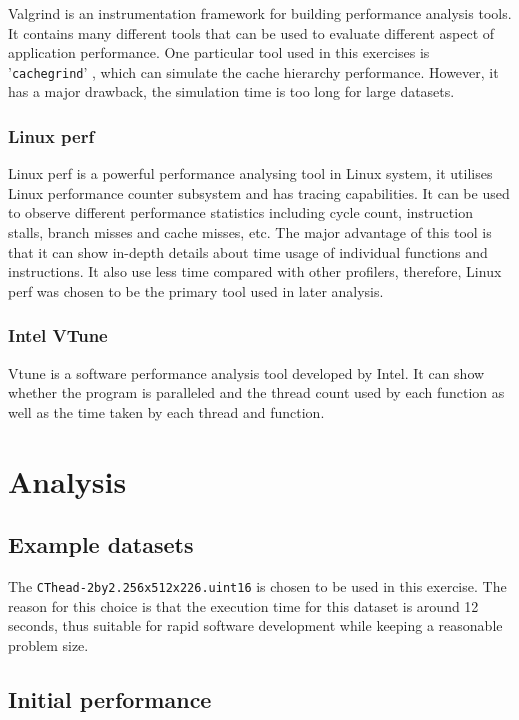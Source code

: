 \documentclass[conference]{IEEEtran}
\begin{document}
Valgrind \cite{nethercote2003valgrind} is an instrumentation framework for building performance analysis tools. It contains many different tools that can be used to evaluate different aspect of application performance. One particular tool used in this exercises is '\texttt{cachegrind}' \cite{seward2004cachegrind}, which can simulate the cache hierarchy performance. However, it has a major drawback, the simulation time is too long for large datasets.

\subsubsection{Linux perf}

Linux perf \cite{de2010new} is a powerful performance analysing tool in Linux system, it utilises Linux performance counter subsystem and has tracing capabilities. It can be used to observe different performance statistics including cycle count, instruction stalls, branch misses and cache misses, etc. The major advantage of this tool is that it can show in-depth details about time usage of individual functions and instructions. It also use less time compared with other profilers, therefore, Linux perf was chosen to be the primary tool used in later analysis.

\subsubsection{Intel VTune}

Vtune \cite{malladi2009using} is a software performance analysis tool developed by Intel. It can show whether the program is paralleled and the thread count used by each function as well as the time taken by each thread and function.  

\section{Analysis}

\subsection{Example datasets}

The \texttt{CThead-2by2.256x512x226.uint16} is chosen to be used in this exercise. The reason for this choice is that the execution time for this dataset is around 12 seconds, thus suitable for rapid software development while keeping a reasonable problem size.

\subsection{Initial performance}
\end{document}
